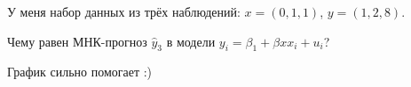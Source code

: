 
\begin{question}
У меня набор данных из трёх наблюдений: \(x = (0, 1, 1)\), \(y = (1, 2, 8)\).

Чему равен МНК-прогноз \(\hat y_3\) в модели \(y_i = \beta_1 + \beta x x_i + u_i\)?
\end{question}

\begin{solution}
График сильно помогает :)
\end{solution}


